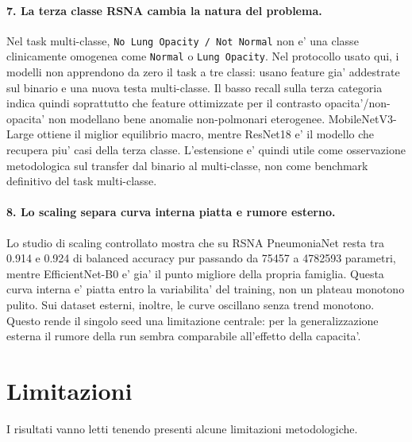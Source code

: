 \documentclass[11pt,a4paper]{article}
\newcommand{\balacc}{balanced accuracy}
\begin{document}
\paragraph{7. La terza classe RSNA cambia la natura del problema.}
Nel task multi-classe, \texttt{No Lung Opacity / Not Normal} non e' una classe
clinicamente omogenea come \texttt{Normal} o \texttt{Lung Opacity}. Nel
protocollo usato qui, i modelli non apprendono da zero il task a tre classi:
usano feature gia' addestrate sul binario e una nuova testa multi-classe. Il
basso recall sulla terza categoria indica quindi soprattutto che feature
ottimizzate per il contrasto opacita'/non-opacita' non modellano bene anomalie
non-polmonari eterogenee. MobileNetV3-Large ottiene il miglior equilibrio macro,
mentre ResNet18 e' il modello che recupera piu' casi della terza classe.
L'estensione e' quindi utile come osservazione metodologica sul transfer dal
binario al multi-classe, non come benchmark definitivo del task multi-classe.

\paragraph{8. Lo scaling separa curva interna piatta e rumore esterno.}
Lo studio di scaling controllato mostra che su RSNA PneumoniaNet resta tra 0.914
e 0.924 di \balacc{} pur passando da 75457 a 4782593 parametri, mentre
EfficientNet-B0 e' gia' il punto migliore della propria famiglia. Questa curva
interna e' piatta entro la variabilita' del training, non un plateau monotono
pulito. Sui dataset esterni, inoltre, le curve oscillano senza trend monotono.
Questo rende il singolo seed una limitazione centrale: per la generalizzazione
esterna il rumore della run sembra comparabile all'effetto della capacita'.

\section{Limitazioni}

I risultati vanno letti tenendo presenti alcune limitazioni metodologiche.
\end{document}
